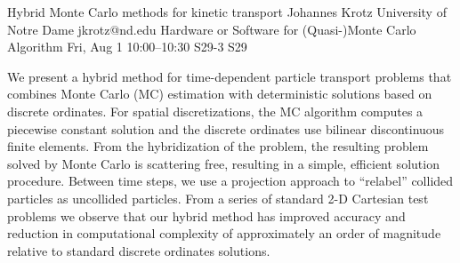 \begin{talk}


\end{talk}

\begin{talk}
  {Hybrid Monte Carlo methods for kinetic transport}%
  {Johannes Krotz}%
  {University of Notre Dame}%
  {jkrotz@nd.edu}%
  {Hardware or Software for (Quasi-)Monte Carlo Algorithm}%
  {}%
  {Fri, Aug 1 10:00--10:30}%
  {S29-3}%
  {S29}%
    
   

We present a hybrid method for time-dependent particle transport problems that combines Monte Carlo (MC) estimation with deterministic solutions based on discrete ordinates. For spatial discretizations, the MC algorithm computes a piecewise constant solution and the discrete ordinates use bilinear discontinuous finite elements. From the hybridization of the problem, the resulting problem solved by Monte Carlo is scattering free, resulting in a simple, efficient solution procedure. Between time steps, we use a projection approach to “relabel” collided particles as uncollided particles. From a series of standard 2-D Cartesian test problems we observe that our hybrid method has improved accuracy and reduction in computational complexity of approximately an order of magnitude relative to standard discrete ordinates solutions.

\end{talk}

